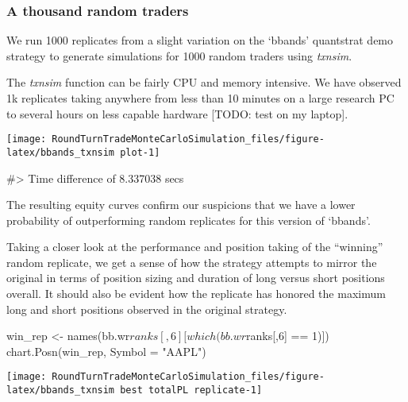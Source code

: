 \hypertarget{a-thousand-random-traders}{%
\subsubsection{A thousand random
traders}\label{a-thousand-random-traders}}

We run 1000 replicates from a slight variation on the `bbands'
quantstrat demo strategy to generate simulations for 1000 random traders
using \emph{txnsim}.

The \emph{txnsim} function can be fairly CPU and memory intensive. We
have observed 1k replicates taking anywhere from less than 10 minutes on
a large research PC to several hours on less capable hardware {[}TODO:
test on my laptop{]}.

\begin{Schunk}


\begin{center}\texttt{[image: RoundTurnTradeMonteCarloSimulation\_files/figure-latex/bbands\_txnsim plot-1]} \end{center}

\begin{Soutput}
#> Time difference of 8.337038 secs
\end{Soutput}
\end{Schunk}

The resulting equity curves confirm our suspicions that we have a lower
probability of outperforming random replicates for this version of
`bbands'.

Taking a closer look at the performance and position taking of the
``winning'' random replicate, we get a sense of how the strategy
attempts to mirror the original in terms of position sizing and duration
of long versus short positions overall. It should also be evident how
the replicate has honored the maximum long and short positions observed
in the original strategy.

\begin{Schunk}
\begin{Sinput}
win_rep <- names(bb.wr$ranks[,6][which(bb.wr$ranks[,6] == 1)])
chart.Posn(win_rep, Symbol = "AAPL") 
\end{Sinput}


\begin{center}\texttt{[image: RoundTurnTradeMonteCarloSimulation\_files/figure-latex/bbands\_txnsim best totalPL replicate-1]} \end{center}

\end{Schunk}


